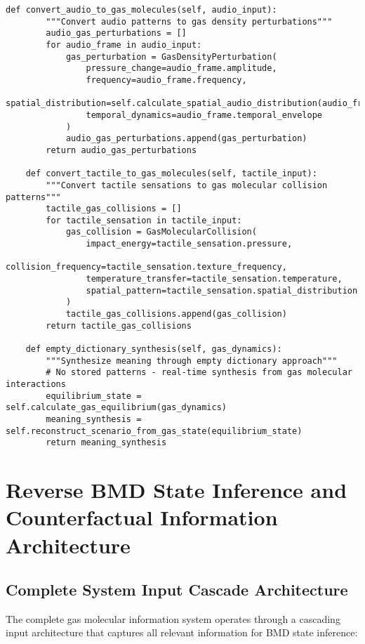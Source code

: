 \documentclass[11pt,a4paper]{article}
\begin{document}
\begin{lstlisting}[style=pythonstyle, caption=Buhera-West Gas Molecular Sensory Integration]
    def convert_audio_to_gas_molecules(self, audio_input):
        """Convert audio patterns to gas density perturbations"""
        audio_gas_perturbations = []
        for audio_frame in audio_input:
            gas_perturbation = GasDensityPerturbation(
                pressure_change=audio_frame.amplitude,
                frequency=audio_frame.frequency,
                spatial_distribution=self.calculate_spatial_audio_distribution(audio_frame),
                temporal_dynamics=audio_frame.temporal_envelope
            )
            audio_gas_perturbations.append(gas_perturbation)
        return audio_gas_perturbations
    
    def convert_tactile_to_gas_molecules(self, tactile_input):
        """Convert tactile sensations to gas molecular collision patterns"""
        tactile_gas_collisions = []
        for tactile_sensation in tactile_input:
            gas_collision = GasMolecularCollision(
                impact_energy=tactile_sensation.pressure,
                collision_frequency=tactile_sensation.texture_frequency,
                temperature_transfer=tactile_sensation.temperature,
                spatial_pattern=tactile_sensation.spatial_distribution
            )
            tactile_gas_collisions.append(gas_collision)
        return tactile_gas_collisions
    
    def empty_dictionary_synthesis(self, gas_dynamics):
        """Synthesize meaning through empty dictionary approach"""
        # No stored patterns - real-time synthesis from gas molecular interactions
        equilibrium_state = self.calculate_gas_equilibrium(gas_dynamics)
        meaning_synthesis = self.reconstruct_scenario_from_gas_state(equilibrium_state)
        return meaning_synthesis
\end{lstlisting}

\section{Reverse BMD State Inference and Counterfactual Information Architecture}

\subsection{Complete System Input Cascade Architecture}

The complete gas molecular information system operates through a cascading input architecture that captures all relevant information for BMD state inference:
\end{document}
